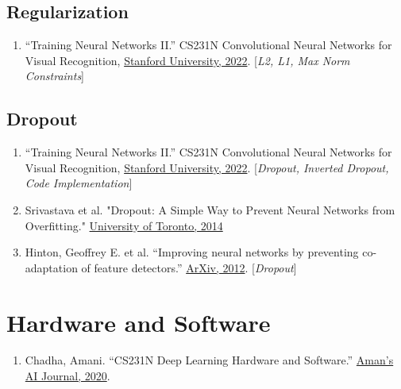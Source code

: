 \documentclass[12pt]{article}
\begin{document}
\subsection{Regularization}
\begin{enumerate}
    \item “Training Neural Networks II.” 
    CS231N Convolutional Neural Networks for Visual Recognition, 
    \href{https://cs231n.github.io/neural-networks-2/#reg}{Stanford University, 2022}. 
    [\emph{L2, L1, Max Norm Constraints}]
\end{enumerate}

\subsection{Dropout}
\begin{enumerate}
    \item “Training Neural Networks II.” 
    CS231N Convolutional Neural Networks for Visual Recognition, 
    \href{https://cs231n.github.io/neural-networks-2/#reg}{Stanford University, 2022}. 
    [\emph{Dropout, Inverted Dropout, Code Implementation}]

    \item Srivastava et al. "Dropout: A Simple Way to Prevent Neural Networks 
    from Overfitting." 
    \href{http://www.cs.toronto.edu/~rsalakhu/papers/srivastava14a.pdf}
    {University of Toronto, 2014}

    \item Hinton, Geoffrey E. et al. “Improving neural networks 
    by preventing co-adaptation of feature detectors.” 
    \href{https://arxiv.org/abs/1207.0580}{ArXiv, 2012}. [\emph{Dropout}] 
\end{enumerate}

\section{Hardware and Software}
\begin{enumerate}
    \item Chadha, Amani. “CS231N Deep Learning Hardware and Software.” 
    \href{https://aman.ai/cs231n/deeplearning-HW-SW/}
    {Aman's AI Journal, 2020}.
\end{enumerate}
\end{document}
